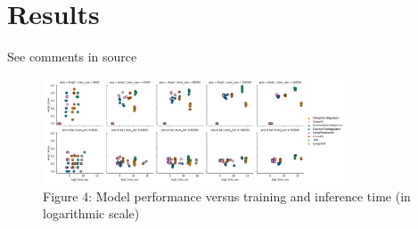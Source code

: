 \section{Results}

See comments in source

\begin{figure}[h]
\centering
\includegraphics[width=0.8\textwidth]{figures/Figure_4.png}
\caption{Figure 4: Model performance versus training and inference time (in logarithmic scale)}
\end{figure}





